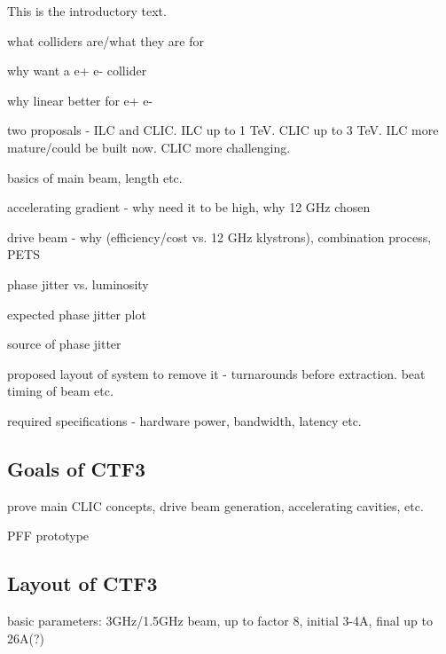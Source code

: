 
This is the introductory text.




what colliders are/what they are for

why want a e+ e- collider

why linear better for e+ e-

two proposals - ILC and CLIC. ILC up to 1 TeV. CLIC up to 3 TeV. ILC more mature/could be built now. CLIC more challenging.


basics of main beam, length etc.

accelerating gradient - why need it to be high, why 12 GHz chosen

drive beam - why (efficiency/cost vs. 12 GHz klystrons), combination process, PETS




phase jitter vs. luminosity

expected phase jitter plot

source of phase jitter

proposed layout of system to remove it - turnarounds before extraction. beat timing of beam etc.

required specifications - hardware power, bandwidth, latency etc.


\subsection{Goals of CTF3}
\label{ss:ctfGoals}

prove main CLIC concepts, drive beam generation, accelerating cavities, etc.

PFF prototype

\subsection{Layout of CTF3}
\label{ss:ctfLayout}

basic parameters: 3GHz/1.5GHz beam, up to factor 8, initial 3-4A, final up to 26A(?)

